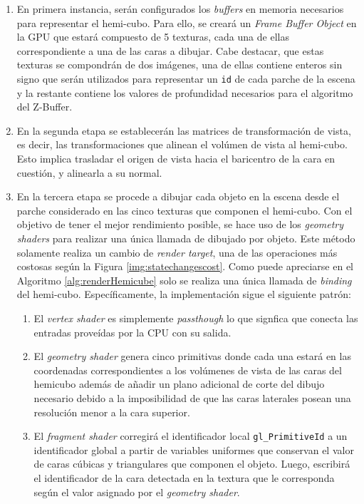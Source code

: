 \begin{enumerate}
	\item En primera instancia, serán configurados los \textit{buffers} en memoria necesarios para representar el hemi-cubo.
	Para ello, se creará un \textit{Frame Buffer Object} en la GPU que estará compuesto de 5 texturas, cada una de ellas correspondiente a una de las caras a dibujar. Cabe destacar, que estas texturas se compondrán de dos imágenes, una de ellas contiene enteros sin signo que serán utilizados para representar un \verb|id| de cada parche de la escena y la restante contiene los valores de profundidad necesarios para el algoritmo del Z-Buffer.
	\item En la segunda etapa se establecerán las matrices de transformación de vista, es decir, las transformaciones que alinean el volúmen de vista al hemi-cubo. Esto implica trasladar el origen de vista hacia el baricentro de la cara en cuestión, y alinearla a su normal.
	\item En la tercera etapa se procede a dibujar cada objeto en la escena desde el parche considerado en las cinco texturas que componen el hemi-cubo. Con el objetivo de tener el mejor rendimiento posible, se hace uso de los \textit{geometry shaders} para realizar una única llamada de dibujado por objeto. Este método solamente realiza un cambio de \textit{render target}, una de las operaciones más costosas según la Figura \ref{img:statechangescost}. Como puede apreciarse en el Algoritmo \ref{alg:renderHemicube} solo se realiza una única llamada de \textit{binding} del hemi-cubo. Específicamente, la implementación sigue el siguiente patrón:
	\begin{enumerate}
		\item El \textit{vertex shader} es simplemente \textit{passthough} lo que signfica que conecta las entradas proveídas por la CPU con su salida.
		\item El \textit{geometry shader} genera cinco primitivas donde cada una estará en las coordenadas correspondientes a los volúmenes de vista de las caras del hemicubo además de añadir un plano adicional de corte del dibujo necesario debido a la imposibilidad de que las caras laterales posean una resolución menor a la cara superior.
		\item El \textit{fragment shader} corregirá el identificador local \verb|gl_PrimitiveId| a un identificador global a partir de variables uniformes que conservan el valor de caras cúbicas y triangulares que componen el objeto. Luego, escribirá el identificador de la cara detectada en la textura que le corresponda según el valor asignado por el \textit{geometry shader}.

\end{enumerate}
\end{enumerate}
